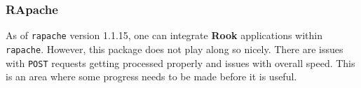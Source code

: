 \documentclass[12pt]{article}
\newcommand{\pkg}[1]{\textbf{#1}}
\newcommand{\code}[1]{\texttt{#1}}
\begin{document}
\subsubsection{RApache}
\label{sec:rapache}

As of \code{rapache} version {1.1.15}, one can integrate \pkg{Rook} applications
within \code{rapache}. However, this package does not play along so
nicely. There are issues with \code{POST} requests getting processed
properly and issues with overall speed. This is an area where some
progress needs to be made before it is useful.






\end{document}
